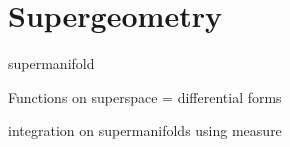 \chapter{Supergeometry} 
\label{appendix3}

\begin{defn}
	supermanifold
\end{defn}

Functions on superspace = differential forms

integration on supermanifolds using measure
